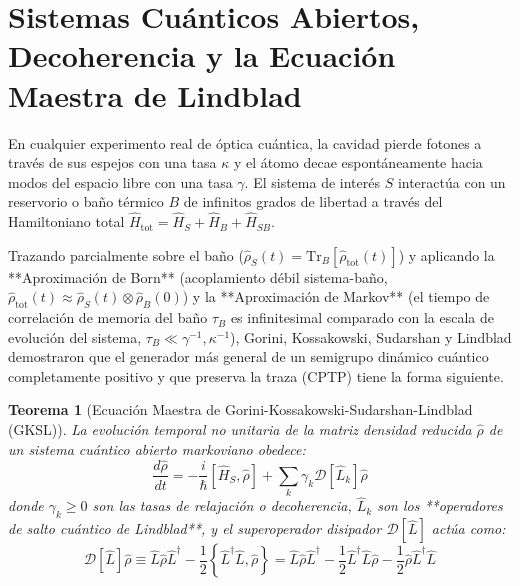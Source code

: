 \documentclass[11pt,a4paper]{book}
\newtheorem{teorema}{Teorema}[chapter]
\begin{document}
\section[Sistemas abiertos y decoherencia]{Sistemas Cuánticos Abiertos, Decoherencia y la Ecuación Maestra de Lindblad}

En cualquier experimento real de óptica cuántica, la cavidad pierde fotones a través de sus espejos con una tasa $\kappa$ y el átomo decae espontáneamente hacia modos del espacio libre con una tasa $\gamma$. El sistema de interés $S$ interactúa con un reservorio o baño térmico $B$ de infinitos grados de libertad a través del Hamiltoniano total $\hat{H}_{\text{tot}} = \hat{H}_S + \hat{H}_B + \hat{H}_{SB}$.

Trazando parcialmente sobre el baño ($\hat{\rho}_S(t) = \text{Tr}_B[\hat{\rho}_{\text{tot}}(t)]$) y aplicando la **Aproximación de Born** (acoplamiento débil sistema-baño, $\hat{\rho}_{\text{tot}}(t) \approx \hat{\rho}_S(t) \otimes \hat{\rho}_B(0)$) y la **Aproximación de Markov** (el tiempo de correlación de memoria del baño $\tau_B$ es infinitesimal comparado con la escala de evolución del sistema, $\tau_B \ll \gamma^{-1}, \kappa^{-1}$), Gorini, Kossakowski, Sudarshan y Lindblad demostraron que el generador más general de un semigrupo dinámico cuántico completamente positivo y que preserva la traza (CPTP) tiene la forma siguiente.

\begin{teorema}[Ecuación Maestra de Gorini-Kossakowski-Sudarshan-Lindblad (GKSL)]
La evolución temporal no unitaria de la matriz densidad reducida $\hat{\rho}$ de un sistema cuántico abierto markoviano obedece:
\begin{equation}
\frac{d\hat{\rho}}{dt} = -\frac{i}{\hbar}[\hat{H}_S, \hat{\rho}] + \sum_{k} \gamma_k \mathcal{D}[\hat{L}_k]\hat{\rho}
\end{equation}
donde $\gamma_k \geq 0$ son las tasas de relajación o decoherencia, $\hat{L}_k$ son los **operadores de salto cuántico de Lindblad**, y el superoperador disipador $\mathcal{D}[\hat{L}]$ actúa como:
\begin{equation}
\mathcal{D}[\hat{L}]\hat{\rho} \equiv \hat{L}\hat{\rho}\hat{L}^\dagger - \frac{1}{2}\left\{ \hat{L}^\dagger \hat{L}, \hat{\rho} \right\} = \hat{L}\hat{\rho}\hat{L}^\dagger - \frac{1}{2}\hat{L}^\dagger \hat{L}\hat{\rho} - \frac{1}{2}\hat{\rho}\hat{L}^\dagger \hat{L}
\end{equation}
\end{teorema}
\end{document}
